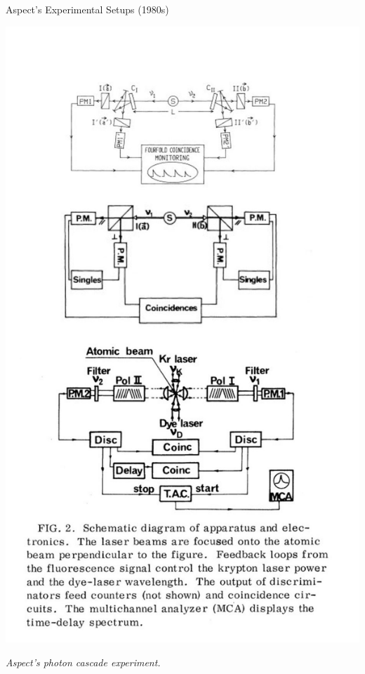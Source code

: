 \begin{frame}{Aspect's Experimental Setups (1980s)}
\begin{minipage}{0.58\textwidth}
\end{minipage}
\hfill
\begin{minipage}{0.38\textwidth}
  \centering
  \includegraphics[width=0.8\linewidth]{images/aspect.jpeg} %
  \par\vspace{0.2cm}
  \small \textit{Aspect’s photon cascade experiment.}
\end{minipage}

\end{frame}


